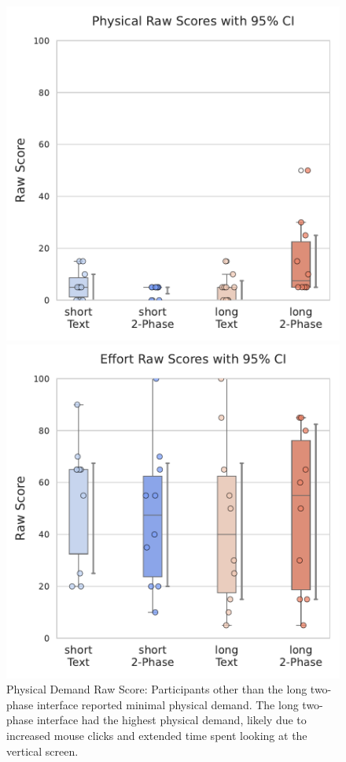 \begin{figure}[h]
    \begin{minipage}[t]{0.45\textwidth}
        \centering
        \includegraphics[width=\textwidth, trim=0 13 0 13, clip]{content/image/cog/Physical_scores.pdf}
        \captionsetup{width=0.9\textwidth, justification=justified}
        \caption{Physical Demand Raw Score: Participants other than the long two-phase interface reported minimal physical demand. The long two-phase interface had the highest physical demand, likely due to increased mouse clicks and extended time spent looking at the vertical screen.}
        \label{fig:physical_cog_score}
    \end{minipage}
    \hfill
    \begin{minipage}[t]{0.45\textwidth}
        \centering
        \includegraphics[width=\textwidth, trim=0 13 0 13, clip]{content/image/cog/Effort_scores.pdf}

\end{minipage}
\end{figure}
